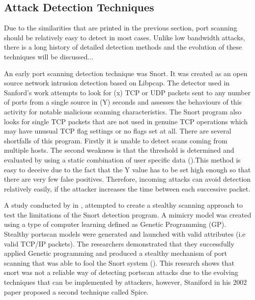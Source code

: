 \subsection{Attack Detection Techniques}

Due to the similarities that are printed in the previous section, port scanning should be relatively easy to detect in most cases. Unlike low bandwidth attacks, there is a long history of detailed detection methods and the evolution of these techniques will be discussed...

An early port scanning detection technique was Snort. It was created as an open source network intrusion detection based on Libpcap. The detector used in Sanford's work attempts to look for (x) TCP or UDP packets sent to any number of ports from a single source in (Y) seconds and assesses the behaviours of this activity for notable malicious scanning characteristics. The Snort program also looks for single TCP packets that are not used in genuine TCP operations which may have unusual TCP flag settings or no flags set at all. There are several shortfalls of this program. Firstly it is unable to detect scans coming from multiple hosts. The second weakness is that the threshold is determined  and evaluated by using a static combination of user specific data (\cite{staniford2002practical}).This method is easy to deceive due to the fact that the Y value has to be set high enough so that there are very few false positives. Therefore, incoming attacks can avoid detection relatively easily, if the attacker increases the time between each successive packet.

A study conducted by \citeauthor{laroche2009evolving} in \citeyear{laroche2009evolving}, attempted to create a stealthy scanning approach to test the limitations of the Snort detection program. A mimicry model was created using a type of computer learning defined as Genetic Programming (GP). Stealthy portscan models were generated and launched with valid attributes (i.e valid TCP/IP packets). The researchers demonstrated that they successfully applied Genetic programming and produced a stealthy mechanism of port scanning that was able to fool the Snort system (\cite{laroche2009evolving}). This research shows that snort was not a reliable way of detecting portscan attacks due to the evolving techniques that can be implemented by attackers, however, Staniford in his 2002 paper proposed a second technique called Spice.
 
